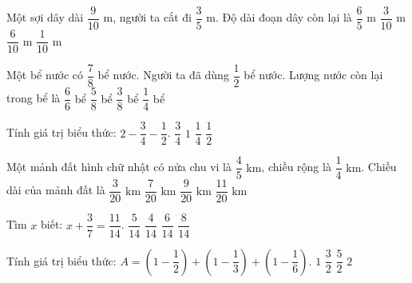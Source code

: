 \begin{ex} %
Một sợi dây dài $\dfrac{9}{10}\text{ m}$, người ta cắt đi $\dfrac{3}{5}\text{ m}$. Độ dài đoạn dây còn lại là
\choice
{$\dfrac{6}{5}\text{ m}$}
{\True $\dfrac{3}{10}\text{ m}$}
{$\dfrac{6}{10}\text{ m}$}
{$\dfrac{1}{10}\text{ m}$}
\end{ex}

\begin{ex} %
Một bể nước có $\dfrac{7}{8}$ bể nước. Người ta đã dùng $\dfrac{1}{2}$ bể nước. Lượng nước còn lại trong bể là
\choice
{$\dfrac{6}{6}$ bể}
{$\dfrac{5}{8}$ bể}
{\True $\dfrac{3}{8}$ bể}
{$\dfrac{1}{4}$ bể}
\end{ex}

\begin{ex} %
Tính giá trị biểu thức: $2 - \dfrac{3}{4} - \dfrac{1}{2}$.
\choice
{\True $\dfrac{3}{4}$}
{$1$}
{$\dfrac{1}{4}$}
{$\dfrac{1}{2}$}
\end{ex}

\begin{ex} %
Một mảnh đất hình chữ nhật có nửa chu vi là $\dfrac{4}{5}\text{ km}$, chiều rộng là $\dfrac{1}{4}\text{ km}$. Chiều dài của mảnh đất là
\choice
{$\dfrac{3}{20}\text{ km}$}
{$\dfrac{7}{20}\text{ km}$}
{$\dfrac{9}{20}\text{ km}$}
{\True $\dfrac{11}{20}\text{ km}$}
\end{ex}

\begin{ex} %
Tìm $x$ biết: $x + \dfrac{3}{7} = \dfrac{11}{14}$.
\choice
{\True $\dfrac{5}{14}$}
{$\dfrac{4}{14}$}
{$\dfrac{6}{14}$}
{$\dfrac{8}{14}$}
\end{ex}

\begin{ex} %
Tính giá trị biểu thức: $A = \left(1 - \dfrac{1}{2}\right) + \left(1 - \dfrac{1}{3}\right) + \left(1 - \dfrac{1}{6}\right)$.
\choice
{$1$}
{$\dfrac{3}{2}$}
{$\dfrac{5}{2}$}
{\True $2$}
\end{ex}

